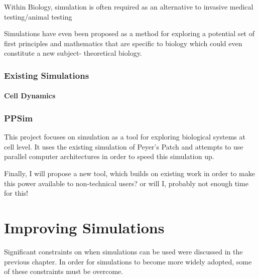 \documentclass{UoYCSproject}
\begin{document}
Within Biology, simulation is often required as an alternative to invasive medical testing/animal testing


Simulations have even been proposed as a method for exploring a potential set of first principles and mathematics that are specific to biology which could even constitute a new subject- theoretical biology\cite{rise_article}.

\subsection{Existing Simulations}

\subsubsection{Cell Dynamics}


\subsection{PPSim}
\label{ppsim}
This project focuses on simulation as a tool for exploring biological systems at cell level. It uses the existing simulation of Peyer's Patch\cite{kieran_thesis} and attempts to use parallel computer architectures in order to speed this simulation up. %

Finally, I will propose a new tool, which builds on existing work in order to make this power available to non-technical users? or will I, probably not enough time for this!

\chapter{Improving Simulations}
\label{improvements}
Significant constraints on when simulations can be used were discussed in the previous chapter. In order for simulations to become more widely adopted, some of these constraints must be overcome.
\end{document}
